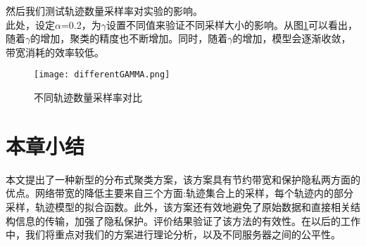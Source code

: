 然后我们测试轨迹数量采样率对实验的影响。\\
此处，设定$\alpha$=0.2，为$\gamma$设置不同值来验证不同采样大小的影响。从图\ref{differentGAMMA}可以看出，随着$\gamma$的增加，聚类的精度也不断增加。同时，随着$\gamma$的增加，模型会逐渐收敛，带宽消耗的效率较低。
\begin{figure}[h]
	\texttt{[image: differentGAMMA.png]}
	\caption{不同轨迹数量采样率对比}
	\label{differentGAMMA}
\end{figure}

\section{本章小结}
本文提出了一种新型的分布式聚类方案，该方案具有节约带宽和保护隐私两方面的优点。网络带宽的降低主要来自三个方面:轨迹集合上的采样，每个轨迹内的部分采样，轨迹模型的拟合函数。此外，该方案还有效地避免了原始数据和直接相关结构信息的传输，加强了隐私保护。评价结果验证了该方法的有效性。在以后的工作中，我们将重点对我们的方案进行理论分析，以及不同服务器之间的公平性。